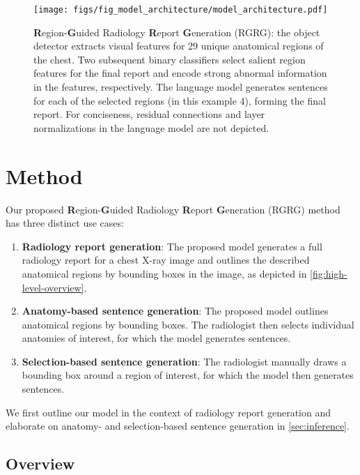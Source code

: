 \documentclass[10pt,twocolumn,letterpaper]{article}
\begin{document}
\begin{figure*}[ht]
  \centering
   \texttt{[image: figs/fig\_model\_architecture/model\_architecture.pdf]}
   \caption{\textbf{R}egion-\textbf{G}uided Radiology \textbf{R}eport \textbf{G}eneration (RGRG): the object detector extracts visual features for 29 unique anatomical regions of the chest. Two subsequent binary classifiers select salient region features for the final report and encode strong abnormal information in the features, respectively. The language model generates sentences for each of the selected regions (in this example 4), forming the final report. For conciseness, residual connections and layer normalizations in the language model are not depicted.}
   \label{fig:model-architecture}
\end{figure*}

\section{Method}
\label{sec:method}

Our proposed \textbf{R}egion-\textbf{G}uided Radiology \textbf{R}eport \textbf{G}eneration (RGRG) method has three distinct use cases:

\begin{enumerate}
  \item \textbf{Radiology report generation}: The proposed model generates a full radiology report for a chest X-ray image and outlines the described anatomical regions by bounding boxes in the image, as depicted in \cref{fig:high-level-overview}.
  \item \textbf{Anatomy-based sentence generation}: The proposed model outlines anatomical regions by bounding boxes. The radiologist then selects individual anatomies of interest, for which the model generates sentences.
  \item \textbf{Selection-based sentence generation}: The radiologist manually draws a bounding box around a region of interest, for which the model then generates sentences. 
\end{enumerate}

We first outline our model in the context of radiology report generation and elaborate on anatomy- and selection-based sentence generation in \cref{sec:inference}.

\subsection{Overview}
\end{document}
